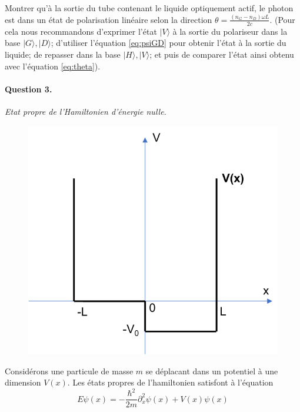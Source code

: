 Montrer qu'à la sortie du tube contenant le liquide optiquement actif, le photon est dans un état de polarisation linéaire selon la direction $\theta = \frac{(n_G - n_D) \omega L}{2 c}$.
(Pour cela nous recommandons d'exprimer l'état $\vert V \rangle$ à la sortie du polariseur dans la base $\vert G\rangle, \vert D \rangle$; d'utiliser l'équation \eqref{eq:psiGD} pour obtenir l'état à la sortie du liquide; de repasser dans la base $\vert H\rangle, \vert V \rangle$; et puis de comparer l'état ainsi obtenu avec l'équation \eqref{eq:theta}).





\paragraph{Question 3.} \textit{Etat propre de l'Hamiltonien d'énergie nulle.} \\

\begin{figure}
\centering
\includegraphics[scale=0.8]{Pictures/FigPot.pdf}
\end{figure}


Considérons une particule de masse $m$ se déplacant dans un potentiel à une dimension $V(x)$. Les états propres de l'hamiltonien satisfont  à l'équation
\begin{equation}
E \psi(x) = - \frac{\hbar^2}{2 m} \partial_x^2 \psi(x) + V(x) \psi(x)
\end{equation}

